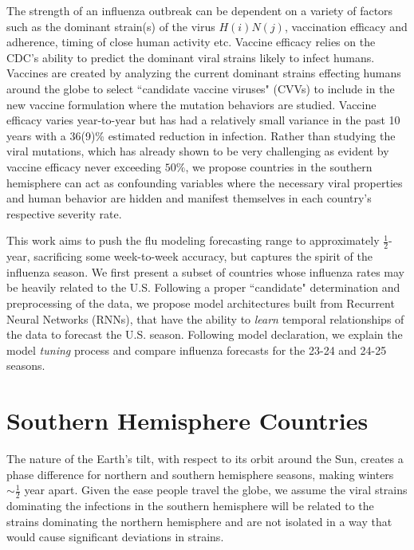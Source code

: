 \documentclass[12pt,a4paper,english]{article}
\begin{document}
The strength of an influenza outbreak can be dependent on a variety of factors such as the dominant strain(s) of the virus $H(i)N(j)$,  vaccination efficacy and adherence, timing of close human activity etc.  Vaccine efficacy relies on the CDC's ability to predict the dominant viral strains likely to infect humans. Vaccines are created by analyzing the current dominant strains effecting humans around the globe to select ``candidate vaccine viruses" (CVVs) to include in the new vaccine formulation where the mutation behaviors are studied. Vaccine efficacy varies year-to-year but has had a relatively small variance in the past 10 years with a 36(9)\% estimated reduction in infection. Rather than studying the viral mutations, which has already shown to be very challenging as evident by vaccine efficacy never exceeding $50\%$, we propose countries in the southern hemisphere can act as confounding variables where the necessary viral properties and human behavior are hidden and manifest themselves in each country's respective severity rate. 

This work aims to push the flu modeling forecasting range to approximately $\frac{1}{2}$-year, sacrificing some week-to-week accuracy, but captures the spirit of the influenza season. We first present a subset of countries whose influenza rates may be heavily related to the U.S. Following a proper ``candidate" determination and preprocessing of the data, we propose model architectures built from Recurrent Neural Networks (RNNs), that have the ability to \textit{learn} temporal relationships of the data to forecast the U.S. season. Following model declaration, we explain the model \textit{tuning} process and compare influenza forecasts for the 23-24 and 24-25 seasons.


\section{Southern Hemisphere Countries}



The nature of the Earth's tilt, with respect to its orbit around the Sun, creates a phase difference for northern and southern hemisphere seasons, making winters $\sim\frac{1}{2}$ year apart. Given the ease people travel the globe, we assume the viral strains dominating the infections in the southern hemisphere will be related to the strains dominating the northern hemisphere and are not isolated in a way that would cause significant deviations in strains.
\end{document}
